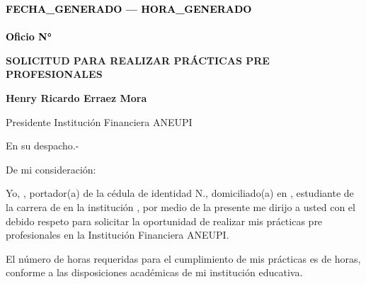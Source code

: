 \documentclass[a4paper,12pt]{article}
\begin{document}
\pagestyle{empty}

\vspace*{-5.5cm}
\begin{flushright}
{\footnotesize \textcolor{black}{\textbf{{{FECHA_GENERADO}} --- {{{HORA_GENERADO}}}}}} \\[-10pt] %
{\footnotesize \textcolor{black}{\underline{\hspace{7.5cm}}}} \\[-2pt] %
{\footnotesize \textcolor{black}{\textbf{Oficio N° }}} 
\end{flushright}


\vspace{2.5cm}
\noindent
\hspace*{\dimexpr\textwidth+1cm\relax}


\begin{center}
    \textbf{\large SOLICITUD PARA REALIZAR PRÁCTICAS PRE PROFESIONALES}
\end{center}

\vspace{0.8cm}

\noindent \textbf{Henry Ricardo Erraez Mora} 

\noindent Presidente Institución Financiera ANEUPI 

\noindent En su despacho.-

\vspace{1cm}

\noindent De mi consideración:

\noindent Yo, \textbf{\underline{\hspace{6cm}}}, portador(a) de la cédula de identidad N.\textbf{\underline{\hspace{4cm}}}, domiciliado(a) en \textbf{\underline{\hspace{8cm}}}, estudiante de la carrera de \textbf{\underline{\hspace{6cm}}} en la institución \textbf{\underline{\hspace{7cm}}}, por medio de la presente me dirijo a usted con el debido respeto para solicitar la oportunidad de realizar mis prácticas pre profesionales en la Institución Financiera ANEUPI.

\vspace{0.5cm}

\noindent El número de horas requeridas para el cumplimiento de mis prácticas es de \textbf{\underline{\hspace{1.2cm}}} horas, conforme a las disposiciones académicas de mi institución educativa.
\end{document}
